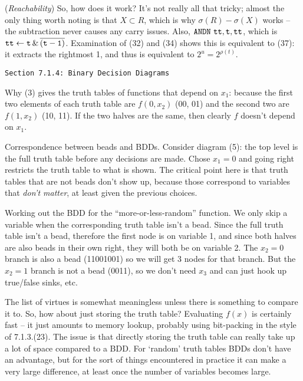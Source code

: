\vskip 0.08in  ({\it Reachability})\hfil\break
So, how does it work?  It's not really all that tricky; almost the only
thing worth noting is that $X \subset R$, which is why $\sigma\left(R\right) -
\sigma\left(X\right)$ works -- the subtraction never causes any carry issues.
Also, ${\tt ANDN\ tt,t,tt}$, which is ${\tt tt} \gets {\tt t \, \& \, \overline{\left( t - 1 \right)}}$.
Examination of (32) and (34) shows this is equivalent to (37): it extracts the
rightmost 1, and thus is equivalent to $2^u = 2^{\rho\left(t\right)}$.

\vfil\break

\vskip 0.3in
\centerline{\tt Section 7.1.4: Binary Decision Diagrams}
\vskip0.2in

\noindent [p 204] Why (3) gives the truth tables of functions that
depend on $x_1$: because the first two elements of each truth table
are $f\left(0, x_2\right)$ (00, 01) and the second two are $f\left(1, x_2\right)$
(10, 11).  If the two halves are the same, then clearly $f$ doesn't
depend on $x_1$.

\vskip 0.08in \noindent [p205] Correspondence between beads and BDDs.\hfil\break
Consider diagram (5): the top level is the full truth table before any
decisions are made.  Chose $x_1 = 0$ and going right restricts
the truth table to what is shown.  The critical point here is that truth
tables that are not beads don't show up, because those correspond
to variables that {\it don't matter}, at least given the previous choices.

\vskip 0.08in \noindent [p 205] Working out the BDD for the ``more-or-less-random''
function.\hfil\break
We only skip a variable when the corresponding truth table isn't a bead.  Since
the full truth table isn't a bead, therefore the first node is on variable 1, and
since both halves are also beads in their own right, they will both be on
variable 2.  The $x_2 = 0$ branch is also a bead (11001001) so we will
get 3 nodes for that branch.  But the $x_2 = 1$ branch is not a bead
(0011), so we don't need $x_3$ and can just hook up true/false sinks, etc.

\vskip 0.08in 

\noindent [p 206] The list of virtues is somewhat meaningless unless there is something
to compare it to.  So, how about just storing the truth table?  Evaluating
$f\left(x\right)$ is certainly fast -- it just amounts to memory lookup, probably
using bit-packing in the style of 7.1.3.(23).  The issue is that directly
storing the truth table can really take up a lot of space compared to a BDD.
For `random' truth tables BDDs don't have an advantage, but for the
sort of things encountered in practice it can make a very large difference,
at least once the number of variables becomes large.  

